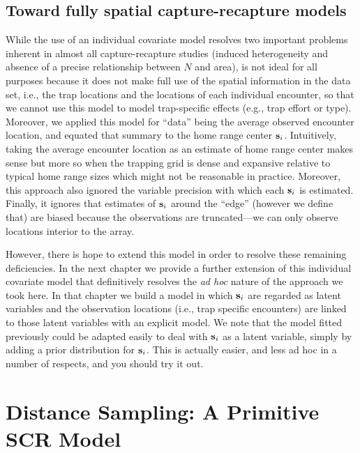 \subsection{Toward fully spatial  capture-recapture models}

While the use of an individual covariate model resolves two important
problems inherent in almost all capture-recapture studies (induced
heterogeneity and absence of a precise relationship between $N$ and
area), is not ideal for all purposes because it does not make full use
of the spatial information in the data set, i.e., the trap locations
and the locations of each individual encounter, so that we cannot use
this model to model trap-specific effects (e.g., trap effort or type).
Moreover, we applied this model for ``data'' being the average
observed encounter location, and equated that summary to the home
range center ${\bf s}_{i}$. Intuitively, taking the average encounter
location as an estimate of home range center makes sense but more so
when the trapping grid is dense and expansive relative to typical home
range sizes which might not be reasonable in practice.  Moreover, this
approach also ignored the variable precision with which each ${\bf
  s}_{i}$ is estimated. Finally, it ignores that estimates of ${\bf
  s}_{i}$ around the ``edge'' (however we define that) are biased
because the observations are truncated---we can only observe locations
interior to the array.

However, there is hope to extend this model in order to resolve
these remaining deficiencies.  In the next chapter we provide a further
extension of this individual covariate model that definitively
resolves the {\it ad hoc} nature of the approach we
took here. In that chapter we build a model in which ${\bf s}_{i}$ are
regarded as latent variables and the observation locations (i.e., trap
specific encounters) are linked to those latent variables with an
explicit model. We note that the model fitted previously could be
adapted easily to deal with ${\bf s}_{i}$ as a latent variable, simply
by adding a prior distribution for ${\bf s}_{i}$.  This is actually
easier, and less ad hoc in a number of respects, and you should try it out.



\section{Distance Sampling: A Primitive SCR Model}

